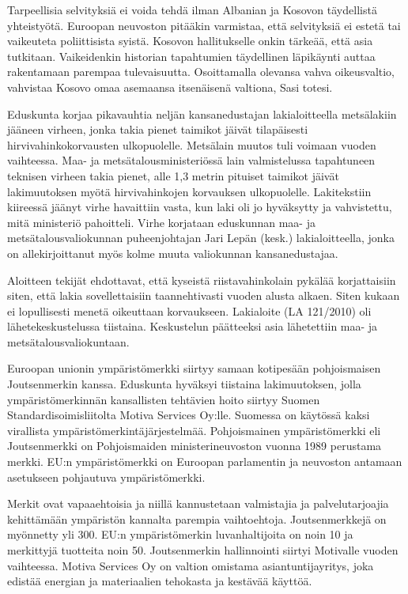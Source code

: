Tarpeellisia selvityksiä ei voida tehdä ilman Albanian ja Kosovon
täydellistä yhteistyötä. Euroopan neuvoston pitääkin varmistaa, että
selvityksiä ei estetä tai vaikeuteta poliittisista syistä. Kosovon
hallitukselle onkin tärkeää, että asia tutkitaan. Vaikeidenkin
historian tapahtumien täydellinen läpikäynti auttaa rakentamaan
parempaa tulevaisuutta. Osoittamalla olevansa vahva oikeusvaltio,
vahvistaa Kosovo omaa asemaansa itsenäisenä valtiona, Sasi totesi.

Eduskunta korjaa pikavauhtia neljän kansanedustajan lakialoitteella
metsälakiin jääneen virheen, jonka takia pienet taimikot jäivät
tilapäisesti hirvivahinkokorvausten ulkopuolelle.  Metsälain muutos
tuli voimaan vuoden vaihteessa. Maa- ja metsätalousministeriössä lain
valmistelussa tapahtuneen teknisen virheen takia pienet, alle 1,3
metrin pituiset taimikot jäivät lakimuutoksen myötä hirvivahinkojen
korvauksen ulkopuolelle.  Lakitekstiin kiireessä jäänyt virhe
havaittiin vasta, kun laki oli jo hyväksytty ja vahvistettu, mitä
ministeriö pahoitteli. Virhe korjataan eduskunnan maa- ja
metsätalousvaliokunnan puheenjohtajan Jari Lepän (kesk.)
lakialoitteella, jonka on allekirjoittanut myös kolme muuta
valiokunnan kansanedustajaa.

Aloitteen tekijät ehdottavat, että kyseistä riistavahinkolain pykälää
korjattaisiin siten, että lakia sovellettaisiin taannehtivasti vuoden
alusta alkaen. Siten kukaan ei lopullisesti menetä oikeuttaan
korvaukseen.  Lakialoite (LA 121/2010) oli lähetekeskustelussa
tiistaina. Keskustelun päätteeksi asia lähetettiin maa- ja
metsätalousvaliokuntaan.

Euroopan unionin ympäristömerkki siirtyy samaan kotipesään
pohjoismaisen Joutsenmerkin kanssa. Eduskunta hyväksyi tiistaina
lakimuutoksen, jolla ympäristömerkinnän kansallisten tehtävien hoito
siirtyy Suomen Standardisoimisliitolta Motiva Services Oy:lle.
Suomessa on käytössä kaksi virallista
ympäristömerkintäjärjestelmää. Pohjoismainen ympäristömerkki eli
Joutsenmerkki on Pohjoismaiden ministerineuvoston vuonna 1989
perustama merkki. EU:n ympäristömerkki on Euroopan parlamentin ja
neuvoston antamaan asetukseen pohjautuva ympäristömerkki.

Merkit ovat vapaaehtoisia ja niillä kannustetaan valmistajia ja
palvelutarjoajia kehittämään ympäristön kannalta parempia
vaihtoehtoja. Joutsenmerkkejä on myönnetty yli 300. EU:n
ympäristömerkin luvanhaltijoita on noin 10 ja merkittyjä tuotteita
noin 50.  Joutsenmerkin hallinnointi siirtyi Motivalle vuoden
vaihteessa. Motiva Services Oy on valtion omistama asiantuntijayritys,
joka edistää energian ja materiaalien tehokasta ja kestävää käyttöä.

